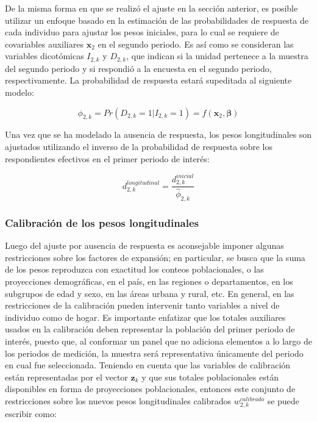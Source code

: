 \documentclass[
  12pt,
]{book}
\begin{document}
De la misma forma en que se realizó el ajuste en la sección anterior, es posible utilizar un enfoque basado en la estimación de las probabilidades de respuesta de cada individuo para ajustar los pesos iniciales, para lo cual se requiere de covariables auxiliares \(\mathbf{x}_{2}\) en el segundo periodo. Es así como se consideran las variables dicotómicas \(I_{2, k}\) y \(D_{2, k}\), que indican si la unidad pertenece a la muestra del segundo periodo y si respondió a la encuesta en el segundo periodo, respectivamente. La probabilidad de respuesta estará supeditada al siguiente modelo:

\[
\phi_{2, k} = Pr(D_{2, k} = 1|I_{2, k} = 1) = f(\mathbf{x}_{2}, \boldsymbol\beta)
\]

Una vez que se ha modelado la ausencia de respuesta, los pesos longitudinales son ajustados utilizando el inverso de la probabilidad de respuesta sobre los respondientes efectivos en el primer periodo de interés:

\[
d_{2, k}^{longitudinal} = \frac{d_{2, k}^{inicial}}{\hat{\phi}_{2, k} }
\]

\hypertarget{calibraciuxf3n-de-los-pesos-longitudinales}{%
\subsubsection{Calibración de los pesos longitudinales}\label{calibraciuxf3n-de-los-pesos-longitudinales}}

Luego del ajuste por ausencia de respuesta es aconsejable imponer algunas restricciones sobre los factores de expansión; en particular, se busca que la suma de los pesos reproduzca con exactitud los conteos poblacionales, o las proyecciones demográficas, en el país, en las regiones o departamentos, en los subgrupos de edad y sexo, en las áreas urbana y rural, etc. En general, en las restricciones de la calibración pueden intervenir tanto variables a nivel de individuo como de hogar. Es importante enfatizar que los totales auxiliares usados en la calibración deben representar la población del primer periodo de interés, puesto que, al conformar un panel que no adiciona elementos a lo largo de los periodos de medición, la muestra será representativa únicamente del periodo en cual fue seleccionada. Teniendo en cuenta que las variables de calibración están representadas por el vector \(\mathbf{z}_k\) y que sus totales poblacionales están disponibles en forma de proyecciones poblacionales, entonces este conjunto de restricciones sobre los nuevos pesos longitudinales calibrados \(w_{2, k}^{calibrado}\) se puede escribir como:
\end{document}
